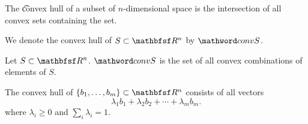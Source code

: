 


The \t{convex hull} of a subset of $n$-dimensional space is the intersection of all convex sets containing the set.


We denote the convex hull of $S \subset \R^n$ by $\conv S$.



\begin{prop}
  Let $S \subset \R^n$. $\conv S$ is the set of all convex combinations of elements of $S$.
\end{prop}

\begin{prop}
  The convex hull of $\set{b_1, \dots, b_m} \subset \R^n$ consists of all vectors
  $$
    \lambda_1b_1 + \lambda_2b_2 + \cdots + \lambda_mb_m.
  $$
  where $\lambda_i \geq 0$ and $\sum_{i}\lambda_i = 1$.
\end{prop}
